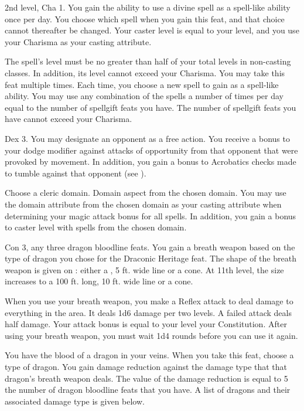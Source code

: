 \featpre 2nd level, Cha 1.
\featben You gain the ability to use a divine spell as a spell-like ability once per day. You choose which spell when you gain this feat, and that choice cannot thereafter be changed. Your caster level is equal to your level, and you use your Charisma as your casting attribute.

The spell's level must be no greater than half of your total levels in non-casting classes. In addition, its level cannot exceed your Charisma.
 You may take this feat multiple times. Each time, you choose a new spell to gain as a spell-like ability. You may use any combination of the spells a number of times per day equal to the number of spellgift feats you have. The number of spellgift feats you have cannot exceed your Charisma.

 Dex 3.
 You may designate an opponent as a free action. You receive a  bonus to your dodge modifier against attacks of opportunity from that opponent that were provoked by movement. In addition, you gain a  bonus to Acrobatics checks made to tumble against that opponent (see ).

Choose a cleric domain.
\featpre Domain aspect from the chosen domain.
\featben You may use the domain attribute from the chosen domain as your casting attribute when determining your magic attack bonus for all spells. In addition, you gain a  bonus to caster level with spells from the chosen domain.

 Con 3, any three dragon bloodline feats.
 You gain a breath weapon based on the type of dragon you chose for the Draconic Heritage feat. The shape of the breath weapon is given on : either a \arealarge, 5 ft. wide line or a \areamed cone. At 11th level, the size increases to a 100 ft. long, 10 ft. wide line or a \arealarge cone.

When you use your breath weapon, you make a Reflex attack to deal damage to everything in the area. It deals 1d6 damage per two levels. A failed attack deals half damage. Your attack bonus is equal to your level \add your Constitution. After using your breath weapon, you must wait 1d4 rounds before you can use it again.

 You have the blood of a dragon in your veins. When you take this feat, choose a type of dragon. You gain damage reduction against the damage type that that dragon's breath weapon deals. The value of the damage reduction is equal to 5 \mtimes the number of dragon bloodline feats that you have. A list of dragons and their associated damage type is given below.

